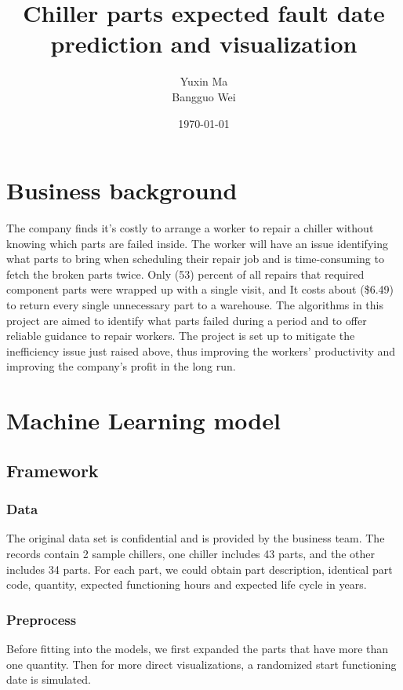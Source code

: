 \documentclass[11pt]{article}
\title{Chiller parts expected fault date prediction and visualization}
\author{Yuxin Ma\\
        Bangguo Wei\\
        }
\date{\today}
\begin{document}
\maketitle

\tableofcontents

\newpage

\section{Business background}

The company finds it’s costly to arrange a worker to repair a chiller without knowing which parts are failed inside. The worker will have an issue identifying what parts to bring when scheduling their repair job and is time-consuming to fetch the broken parts twice. Only (53) percent of all repairs that required component parts were wrapped up with a single visit, and It costs about (\$6.49) to return every single unnecessary part to a warehouse. The algorithms in this project are aimed to identify what parts failed during a period and to offer reliable guidance to repair workers. The project is set up to mitigate the inefficiency issue just raised above, thus improving the workers' productivity and improving the company's profit in the long run.

\section{Machine Learning model}

\subsection{Framework}

\subsubsection{Data}
The original data set is confidential and is provided by the business team. The records contain 2 sample chillers, one chiller includes 43 parts, and the other includes 34 parts. For each part, we could obtain part description, identical part code, quantity, expected functioning hours and expected life cycle in years.

\subsubsection{Preprocess}
Before fitting into the models, we first expanded the parts that have more than one quantity. Then for more direct visualizations, a randomized start functioning date is simulated.
\end{document}

